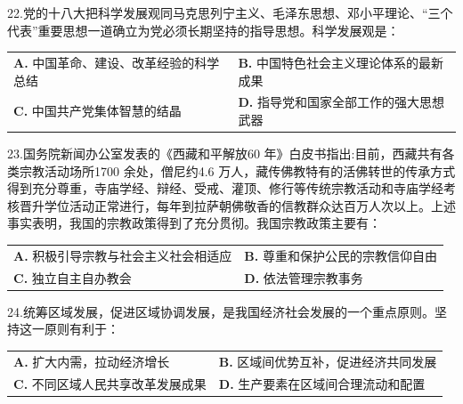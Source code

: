 \documentclass[UTF8,11pt]{ctexart}
\begin{document}
22.党的十八大把科学发展观同马克思列宁主义、毛泽东思想、邓小平理论、“三个代表”重要思想一道确立为党必须长期坚持的指导思想。科学发展观是：


\begin{center}\begin{tabular}{>{\raggedright\arraybackslash}p{\dimexpr(\linewidth-4\tabcolsep)/2\relax}>{\raggedright\arraybackslash}p{\dimexpr(\linewidth-4\tabcolsep)/2\relax}}
\textbf{A.} 中国革命、建设、改革经验的科学总结 & \textbf{B.} 中国特色社会主义理论体系的最新成果\\[.35em]
\textbf{C.} 中国共产党集体智慧的结晶 & \textbf{D.} 指导党和国家全部工作的强大思想武器\\[.35em]\end{tabular}\end{center}

23.国务院新闻办公室发表的《西藏和平解放60 年》白皮书指出:目前，西藏共有各类宗教活动场所1700 余处，僧尼约4.6 万人，藏传佛教特有的活佛转世的传承方式得到充分尊重，寺庙学经、辩经、受戒、灌顶、修行等传统宗教活动和寺庙学经考核晋升学位活动正常进行，每年到拉萨朝佛敬香的信教群众达百万人次以上。上述事实表明，我国的宗教政策得到了充分贯彻。我国宗教政策主要有：


\begin{center}\begin{tabular}{>{\raggedright\arraybackslash}p{\dimexpr(\linewidth-4\tabcolsep)/2\relax}>{\raggedright\arraybackslash}p{\dimexpr(\linewidth-4\tabcolsep)/2\relax}}
\textbf{A.} 积极引导宗教与社会主义社会相适应 & \textbf{B.} 尊重和保护公民的宗教信仰自由\\[.35em]
\textbf{C.} 独立自主自办教会 & \textbf{D.} 依法管理宗教事务\\[.35em]\end{tabular}\end{center}

24.统筹区域发展，促进区域协调发展，是我国经济社会发展的一个重点原则。坚持这一原则有利于：


\begin{center}\begin{tabular}{>{\raggedright\arraybackslash}p{\dimexpr(\linewidth-4\tabcolsep)/2\relax}>{\raggedright\arraybackslash}p{\dimexpr(\linewidth-4\tabcolsep)/2\relax}}
\textbf{A.} 扩大内需，拉动经济增长 & \textbf{B.} 区域间优势互补，促进经济共同发展\\[.35em]
\textbf{C.} 不同区域人民共享改革发展成果 & \textbf{D.} 生产要素在区域间合理流动和配置\\[.35em]\end{tabular}\end{center}
\end{document}
